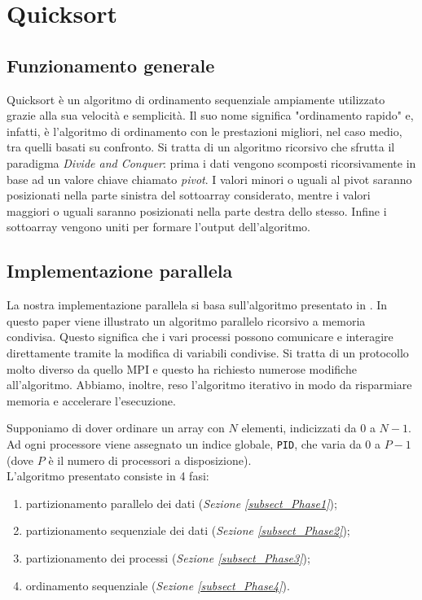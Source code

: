 \chapter{Quicksort} \label{chap.QuickSort}
\section{Funzionamento generale}
Quicksort è un algoritmo di ordinamento sequenziale ampiamente utilizzato grazie alla sua velocità e semplicità. Il suo nome significa "ordinamento rapido" e, infatti, è l'algoritmo di ordinamento con le prestazioni migliori, nel caso medio, tra quelli basati su confronto.
Si tratta di un algoritmo ricorsivo che sfrutta il paradigma \textit{Divide and Conquer}: prima i dati vengono scomposti ricorsivamente in base ad un valore chiave chiamato \textit{pivot}. I valori minori o uguali al pivot saranno posizionati nella parte sinistra del sottoarray considerato, mentre i valori maggiori o uguali saranno posizionati nella parte destra dello stesso. Infine i sottoarray vengono uniti per formare l'output dell'algoritmo. \\

\section{Implementazione parallela}
La nostra implementazione parallela si basa sull'algoritmo presentato in \cite{PaperQuickSort}. In questo paper viene illustrato un algoritmo parallelo ricorsivo a memoria condivisa. Questo significa che i vari processi possono comunicare e interagire direttamente tramite la modifica di variabili condivise. Si tratta di un protocollo molto diverso da quello MPI e questo ha richiesto numerose modifiche all'algoritmo. Abbiamo, inoltre, reso l'algoritmo iterativo in modo da risparmiare memoria e accelerare l'esecuzione.

Supponiamo di dover ordinare un array con $N$ elementi, indicizzati da $0$ a $N-1$. Ad ogni processore viene assegnato un indice globale, \texttt{PID}, che varia da $0$ a $P-1$ (dove $P$ è il numero di processori a disposizione).\\
L'algoritmo presentato consiste in 4 fasi:
\begin{enumerate}
\item partizionamento parallelo dei dati (\textit{Sezione \ref{subsect_Phase1}});
\item partizionamento sequenziale dei dati (\textit{Sezione \ref{subsect_Phase2}});
\item partizionamento dei processi (\textit{Sezione \ref{subsect_Phase3}});
\item ordinamento sequenziale (\textit{Sezione \ref{subsect_Phase4}}).
\end{enumerate}
 

